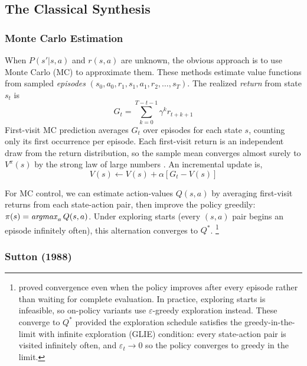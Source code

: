 
\subsection{The Classical Synthesis}
\label{sec:classical_synthesis}

\subsubsection{Monte Carlo Estimation}

When $P(s'|s,a)$ and $r(s,a)$ are unknown, the obvious approach is to use Monte Carlo (MC) to approximate them. These methods estimate value functions from sampled \textit{episodes} $(s_0, a_0, r_1, s_1, a_1, r_2, \ldots, s_T)$. The realized \textit{return} from state $s_t$ is
\begin{equation}
G_t = \sum_{k=0}^{T-t-1} \gamma^k r_{t+k+1}
\end{equation}
First-visit MC prediction averages $G_t$ over episodes for each state $s$, counting only its first occurrence per episode. Each first-visit return is an independent draw from the return distribution, so the sample mean converges almost surely to $V^\pi(s)$ by the strong law of large numbers \citep{sutton2018}. An incremental update is, $$V(s) \leftarrow V(s) + \alpha[G_t - V(s)]$$

For MC control, we can estimate action-values $Q(s,a)$ by averaging first-visit returns from each state-action pair, then improve the policy greedily: $\pi(s) = \mathop{\it argmax}_a Q(s,a)$. Under exploring starts (every $(s,a)$ pair begins an episode infinitely often), this alternation converges to $Q^*$. \footnote{\citet{tsitsiklis2002} proved convergence even when the policy improves after every episode rather than waiting for complete evaluation. In practice, exploring starts is infeasible, so on-policy variants use $\varepsilon$-greedy exploration instead. These converge to $Q^*$ provided the exploration schedule satisfies the greedy-in-the-limit with infinite exploration (GLIE) condition: every state-action pair is visited infinitely often, and $\varepsilon_t \to 0$ so the policy converges to greedy in the limit.}

\subsubsection{Sutton (1988)}

